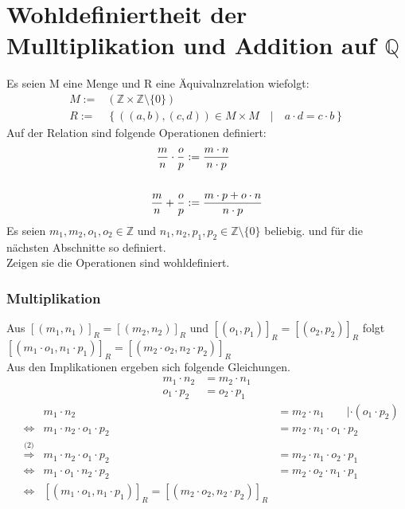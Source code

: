 \documentclass[18pt, 4paper]{article}
\begin{document}
\section*{Wohldefiniertheit der Mulltiplikation und Addition auf $\mathbb{Q}$}
Es seien M eine Menge und R eine Äquivalnzrelation wiefolgt:
\begin{align*}
	M:=&\left(\mathbb{Z} \times \mathbb{Z}\setminus\{0\}\right)\\
	R:=&\left\{\left(\left(a,b\right),\left(c,d\right)\right) \in M \times M \quad |\quad a \cdot d = c \cdot b  \right\}
\end{align*}
Auf der Relation sind folgende Operationen definiert:
\begin{align*}
	\frac{m}{n} \cdot \frac{o}{p} &:= \frac{m \cdot n}{n \cdot p}\\
	\hfill\\
	\frac{m}{n} + \frac{o}{p} &:= \frac{m \cdot p + o \cdot n}{n \cdot p}
\end{align*}
Es seien $m_1,m_2,o_1,o_2 \in \mathbb{Z}$ und $n_1,n_2,p_1,p_2 \in \mathbb{Z}\setminus\{0\}$ beliebig. und für die nächsten Abschnitte so definiert.\\
Zeigen sie die Operationen sind wohldefiniert.
\subsubsection*{Multiplikation}
Aus $[(m_1,n_1)]_R = [(m_2,n_2)]_R$ und $[(o_1,p_1)]_R = [(o_2,p_2)]_R$ folgt $[(m_1 \cdot o_1,n_1 \cdot p_1)]_R = [(m_2 \cdot o_2,n_2 \cdot p_2)]_R$\\
Aus den Implikationen ergeben sich folgende Gleichungen.
\begin{align}
	m_1 \cdot n_2 &= m_2 \cdot n_1\\
	o_1 \cdot p_2 &= o_2 \cdot p_1
\end{align}
\begin{align*}
	&&m_1 \cdot n_2 &= m_2 \cdot n_1\qquad| \cdot(o_1\cdot p_2)\\
	&\Leftrightarrow& m_1 \cdot n_2 \cdot o_1\cdot p_2&= m_2 \cdot n_1\cdot o_1\cdot p_2\\
	&\stackrel{\text{(2)}}{\Rightarrow}&m_1 \cdot n_2 \cdot o_1\cdot p_2&= m_2 \cdot n_1\cdot o_2\cdot p_1\\
	&\Leftrightarrow&m_1 \cdot o_1 \cdot n_2\cdot p_2&= m_2 \cdot o_2\cdot n_1\cdot p_1\\
	&\Leftrightarrow&[(m_1 \cdot o_1,n_1 \cdot p_1)]_R = [(m_2 \cdot o_2,n_2 \cdot p_2)]_R
\end{align*}
\end{document}
